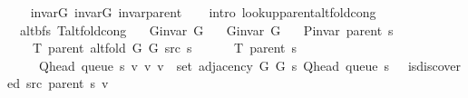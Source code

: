 \begin{isabellebody}
%
\isadelimproof
\ \ %
\endisadelimproof
%
\isatagproof
{}\isamarkupfalse%
\ invar{\isacharunderscore}{\kern0pt}G{}\ invar{\isacharunderscore}{\kern0pt}G{}\ invar{\isacharunderscore}{\kern0pt}parent\isanewline
\ \ \isamarkupfalse%
\ {\isacharparenleft}{\kern0pt}intro\ lookup{\isacharunderscore}{\kern0pt}parent{\isacharunderscore}{\kern0pt}alt{\isacharunderscore}{\kern0pt}fold{\isacharunderscore}{\kern0pt}cong{\isacharparenright}{\kern0pt}%
\endisatagproof
{\isafoldproof}%
%
\isadelimproof
\isanewline
%
\endisadelimproof
\isanewline
{}\isamarkupfalse%
\ {\isacharparenleft}{\kern0pt}\ alt{\isacharunderscore}{\kern0pt}bfs{\isacharparenright}{\kern0pt}\ T{\isacharunderscore}{\kern0pt}alt{\isacharunderscore}{\kern0pt}fold{\isacharunderscore}{\kern0pt}cong{\isacharcolon}{\kern0pt}\isanewline
\ \ \ {\isachardoublequoteopen}G{\isachardot}{\kern0pt}invar\ G{}{\isachardoublequoteclose}\isanewline
\ \ \ {\isachardoublequoteopen}G{\isachardot}{\kern0pt}invar\ G{}{\isachardoublequoteclose}\isanewline
\ \ \ {\isachardoublequoteopen}P{\isacharunderscore}{\kern0pt}invar\ {\isacharparenleft}{\kern0pt}parent\ s{\isacharparenright}{\kern0pt}{\isachardoublequoteclose}\isanewline
\ \ \isanewline
\ \ \ \ {\isachardoublequoteopen}T\ {\isacharparenleft}{\kern0pt}parent\ {\isacharparenleft}{\kern0pt}alt{\isacharunderscore}{\kern0pt}fold\ G{}\ G{}\ src\ s{\isacharparenright}{\kern0pt}{\isacharparenright}{\kern0pt}\ {\isacharequal}{\kern0pt}\isanewline
\ \ \ \ \ T\ {\isacharparenleft}{\kern0pt}parent\ s{\isacharparenright}{\kern0pt}\ {\isasymunion}\isanewline
\ \ \ \ \ {\isacharbraceleft}{\kern0pt}{\isacharparenleft}{\kern0pt}Q{\isacharunderscore}{\kern0pt}head\ {\isacharparenleft}{\kern0pt}queue\ s{\isacharparenright}{\kern0pt}{\isacharcomma}{\kern0pt}\ v{\isacharparenright}{\kern0pt}\ {\isacharbar}{\kern0pt}v{\isachardot}{\kern0pt}\ v\ {\isasymin}\ set\ {\isacharparenleft}{\kern0pt}adjacency\ G{}\ G{}\ s\ {\isacharparenleft}{\kern0pt}Q{\isacharunderscore}{\kern0pt}head\ {\isacharparenleft}{\kern0pt}queue\ s{\isacharparenright}{\kern0pt}{\isacharparenright}{\kern0pt}{\isacharparenright}{\kern0pt}\ {\isasymand}\ {\isasymnot}\ is{\isacharunderscore}{\kern0pt}discovered\ src\ {\isacharparenleft}{\kern0pt}parent\ s{\isacharparenright}{\kern0pt}\ v{\isacharbraceright}{\kern0pt}{\isachardoublequoteclose}\isanewline
%
\isadelimproof
%
\endisadelimproof
%

\end{isabellebody}
